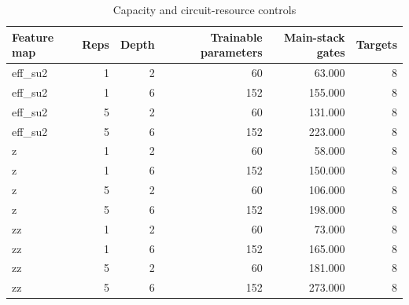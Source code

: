 \begin{table}
\caption{Capacity and circuit-resource controls}
\label{tab:satml_capacity}
\begin{tabular}{lrrrrr}
\toprule
Feature map & Reps & Depth & Trainable parameters & Main-stack gates & Targets \\
\midrule
eff\_su2 & 1 & 2 & 60 & 63.000 & 8 \\
eff\_su2 & 1 & 6 & 152 & 155.000 & 8 \\
eff\_su2 & 5 & 2 & 60 & 131.000 & 8 \\
eff\_su2 & 5 & 6 & 152 & 223.000 & 8 \\
z & 1 & 2 & 60 & 58.000 & 8 \\
z & 1 & 6 & 152 & 150.000 & 8 \\
z & 5 & 2 & 60 & 106.000 & 8 \\
z & 5 & 6 & 152 & 198.000 & 8 \\
zz & 1 & 2 & 60 & 73.000 & 8 \\
zz & 1 & 6 & 152 & 165.000 & 8 \\
zz & 5 & 2 & 60 & 181.000 & 8 \\
zz & 5 & 6 & 152 & 273.000 & 8 \\
\bottomrule
\end{tabular}
\end{table}


